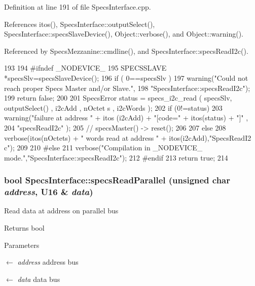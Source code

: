Definition at line 191 of file SpecsInterface.cpp.

References itos(), SpecsInterface::outputSelect(), SpecsInterface::specsSlaveDevice(), Object::verbose(), and Object::warning().

Referenced by SpecsMezzanine::cmdline(), and SpecsInterface::specsReadI2c().


\begin{DoxyCode}
193                                               {
194 #ifndef _NODEVICE_
195   SPECSSLAVE *specsSlv=specsSlaveDevice();
196   if ( 0==specsSlv ){
197     warning("Could not reach proper Specs Master and/or Slave.",
198             "SpecsInterface::specsReadI2c");
199     return false;
200   }
201   SpecsError status = specs_i2c_read ( specsSlv, outputSelect() , i2cAdd , nOctet
      s , i2cWords );
202   if (0!=status){
203     warning("failure at address " + itos (i2cAdd) + "[code=" + itos(status) + "]"
      ,
204             "specsReadI2c" );
205     //    specsMaster() -> reset();
206   }
207   else {
208     verbose(itos(nOctets) + " words read at address " + itos(i2cAdd),"SpecsReadI2
      c");
209   }
210 #else
211   verbose("Compilation in _NODEVICE_ mode.","SpecsInterface::specsReadI2c");
212 #endif
213   return true;
214 }
\end{DoxyCode}
\hypertarget{classSpecsInterface_aefbe6b92a9f9e2f00bf41dd8b2605c05}{
\subsubsection[{specsReadParallel}]{\setlength{\rightskip}{0pt plus 5cm}bool SpecsInterface::specsReadParallel (unsigned char {\em address}, \/  {\bf U16} \& {\em data})}}
\label{classSpecsInterface_aefbe6b92a9f9e2f00bf41dd8b2605c05}
Read data at address on parallel bus

\begin{DoxyReturn}{Returns}
bool 
\end{DoxyReturn}

\begin{DoxyParams}{Parameters}
\item[\mbox{$\leftarrow$} {\em address}]address bus \item[\mbox{$\leftarrow$} {\em data}]data bus \end{DoxyParams}


